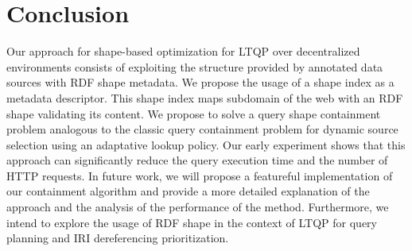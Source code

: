 \section{Conclusion}
Our approach for shape-based optimization for LTQP over decentralized environments consists of exploiting the structure provided by
annotated data sources with RDF shape metadata. 
We propose the usage of a shape index as a metadata descriptor.
This shape index maps subdomain of the web with an RDF shape validating its content.
We propose to solve a query shape containment problem analogous to the classic query containment problem for dynamic source selection
using an adaptative lookup policy. 
Our early experiment shows that this approach can significantly reduce the query execution time and the number of HTTP requests.
In future work, we will propose a featureful implementation of our containment algorithm and provide a more
detailed explanation of the approach and the analysis of the performance of the method.
Furthermore, we intend to explore the usage of RDF shape in the context of LTQP for query planning and IRI dereferencing prioritization.